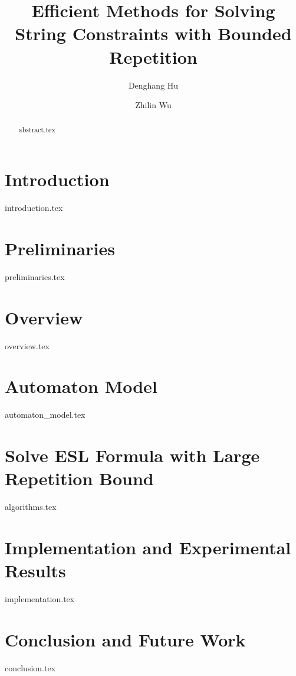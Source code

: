 \documentclass[runningheads]{llncs}
\begin{document}
\title{Efficient Methods for Solving String Constraints with Bounded Repetition}

\author{Denghang Hu \and
  Zhilin Wu}


\maketitle

\begin{abstract}
{abstract.tex}
\end{abstract}


\section{Introduction} \label{sec:intro}
{introduction.tex}

\section{Preliminaries} \label{sec:pre}
{preliminaries.tex}

\section{Overview} \label{sec:overall}
{overview.tex}

\section{Automaton Model} \label{sec:overview}
{automaton_model.tex}

\section{Solve ESL Formula with Large Repetition Bound} \label{sec:algorithm}
{algorithms.tex}

\section{Implementation and Experimental Results} \label{sec:implementation}
{implementation.tex}

\section{Conclusion and Future Work} \label{sec:conclu}
{conclusion.tex}
\end{document}
